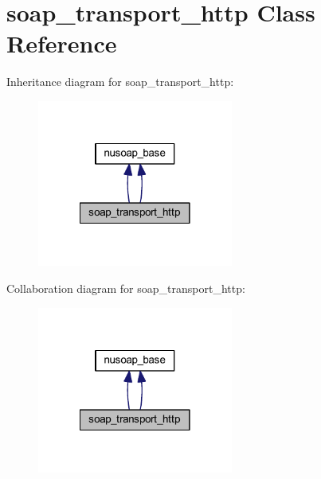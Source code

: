\hypertarget{classsoap__transport__http}{\section{soap\-\_\-transport\-\_\-http Class Reference}
\label{classsoap__transport__http}
}


Inheritance diagram for soap\-\_\-transport\-\_\-http\-:
\nopagebreak
\begin{figure}[H]
\begin{center}
\leavevmode
\includegraphics[width=182pt]{classsoap__transport__http__inherit__graph}
\end{center}
\end{figure}


Collaboration diagram for soap\-\_\-transport\-\_\-http\-:
\nopagebreak
\begin{figure}[H]
\begin{center}
\leavevmode
\includegraphics[width=182pt]{classsoap__transport__http__coll__graph}
\end{center}
\end{figure}
